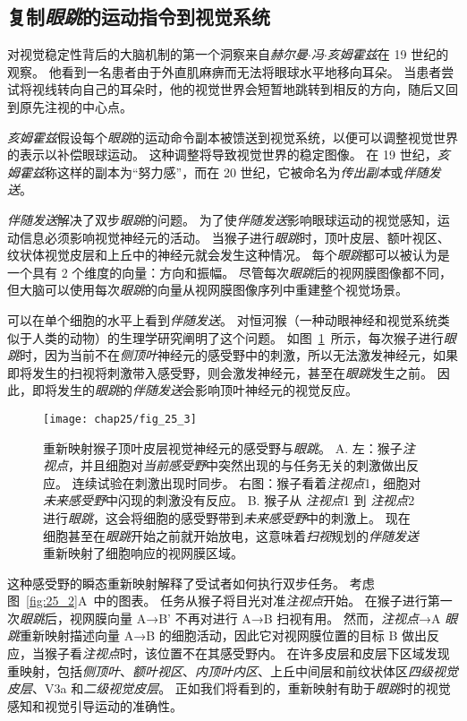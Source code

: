 \subsection{复制\textit{眼跳}的运动指令到视觉系统}

对视觉稳定性背后的大脑机制的第一个洞察来自\textit{赫尔曼$\cdot$冯$\cdot$亥姆霍兹}在 19 世纪的观察。
他看到一名患者由于外直肌麻痹而无法将眼球水平地移向耳朵。
当患者尝试将视线转向自己的耳朵时，他的视觉世界会短暂地跳转到相反的方向，随后又回到原先注视的中心点。


\textit{亥姆霍兹}假设每个\textit{眼跳}的运动命令副本被馈送到视觉系统，以便可以调整视觉世界的表示以补偿眼球运动。
这种调整将导致视觉世界的稳定图像。
在 19 世纪，\textit{亥姆霍兹}称这样的副本为“努力感”，而在 20 世纪，它被命名为\textit{传出副本}或\textit{伴随发送}。


\textit{伴随发送}解决了双步\textit{眼跳}的问题。
为了使\textit{伴随发送}影响眼球运动的视觉感知，运动信息必须影响视觉神经元的活动。
当猴子进行\textit{眼跳}时，顶叶皮层、额叶视区、纹状体视觉皮层和上丘中的神经元就会发生这种情况。
每个\textit{眼跳}都可以被认为是一个具有 2 个维度的向量：方向和振幅。
尽管每次\textit{眼跳}后的视网膜图像都不同，但大脑可以使用每次\textit{眼跳}的向量从视网膜图像序列中重建整个视觉场景。


可以在单个细胞的水平上看到\textit{伴随发送}。
对恒河猴（一种动眼神经和视觉系统类似于人类的动物）的生理学研究阐明了这个问题。
如图~\ref{fig:25_3}~所示，每次猴子进行\textit{眼跳}时，因为当前不在\textit{侧顶叶}神经元的感受野中的刺激，所以无法激发神经元，如果即将发生的扫视将刺激带入感受野，则会激发神经元，甚至在\textit{眼跳}发生之前。
因此，即将发生的\textit{眼跳}的\textit{伴随发送}会影响顶叶神经元的视觉反应。


\begin{figure}[htbp]
	\centering
	\texttt{[image: chap25/fig\_25\_3]}
	\caption{重新映射猴子顶叶皮层视觉神经元的感受野与\textit{眼跳}\cite{duhamel1992updating}。
		A. 左：猴子\textit{注视点}，并且细胞对\textit{当前感受野}中突然出现的与任务无关的刺激做出反应。
		连续试验在刺激出现时同步。
		右图：猴子看着\textit{注视点}1，细胞对\textit{未来感受野}中闪现的刺激没有反应。
		B. 猴子从 \textit{注视点}1 到 \textit{注视点}2 进行\textit{眼跳}，这会将细胞的感受野带到\textit{未来感受野}中的刺激上。
		现在细胞甚至在\textit{眼跳}开始之前就开始放电，这意味着\textit{扫视}规划的\textit{伴随发送}重新映射了细胞响应的视网膜区域。}
	\label{fig:25_3}
\end{figure}


这种感受野的瞬态重新映射解释了受试者如何执行双步任务。
考虑图~\ref{fig:25_2}A~中的图表。
任务从猴子将目光对准\textit{注视点}开始。
在猴子进行第一次\textit{眼跳}后，视网膜向量 A→B' 不再对进行 A→B 扫视有用。
然而，\textit{注视点}→A \textit{眼跳}重新映射描述向量 A→B 的细胞活动，因此它对视网膜位置的目标 B 做出反应，当猴子看\textit{注视点}时，该位置不在其感受野内。
在许多皮层和皮层下区域发现重映射，包括\textit{侧顶叶}、\textit{额叶视区}、\textit{内顶叶内区}、上丘中间层和前纹状体区\textit{四级视觉皮层}、V3a 和\textit{二级视觉皮层}。
正如我们将看到的，重新映射有助于\textit{眼跳}时的视觉感知和视觉引导运动的准确性。



